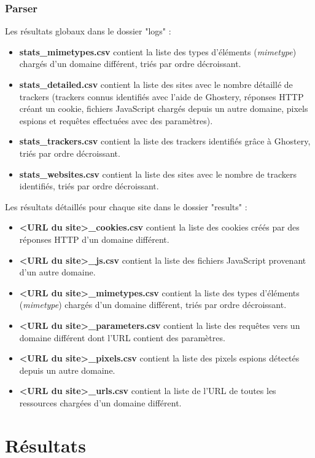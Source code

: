 \subsubsection{Parser}
Les résultats globaux dans le dossier "logs" :
\begin{itemize}
	\item \textbf{stats\_mimetypes.csv} contient la liste des types d'éléments (\textit{mimetype}) chargés d'un domaine différent, triés par ordre décroissant.
	\item \textbf{stats\_detailed.csv} contient la liste des sites avec le nombre détaillé de trackers (trackers connus identifiés avec l'aide de Ghostery, réponses HTTP créant un cookie, fichiers JavaScript chargés depuis un autre domaine, pixels espions et requêtes effectuées avec des paramètres).
	\item \textbf{stats\_trackers.csv} contient la liste des trackers identifiés grâce à Ghostery, triés par ordre décroissant.
	\item \textbf{stats\_websites.csv} contient la liste des sites avec le nombre de trackers identifiés, triés par ordre décroissant.
	\newline
\end{itemize}

Les résultats détaillés pour chaque site dans le dossier "results" :
\begin{itemize}
	\item \textbf{<URL du site>\_cookies.csv} contient la liste des cookies créés par des réponses HTTP d'un domaine différent.
	\item \textbf{<URL du site>\_js.csv} contient la liste des fichiers JavaScript provenant d'un autre domaine.
	\item \textbf{<URL du site>\_mimetypes.csv} contient la liste des types d'éléments (\textit{mimetype}) chargés d'un domaine différent, triés par ordre décroissant.
	\item \textbf{<URL du site>\_parameters.csv} contient la liste des requêtes vers un domaine différent dont l'URL contient des paramètres.
	\item \textbf{<URL du site>\_pixels.csv} contient la liste des pixels espions détectés depuis un autre domaine.
	\item \textbf{<URL du site>\_urls.csv} contient la liste de l'URL de toutes les ressources chargées d'un domaine différent.
	\newline
\end{itemize}

\section{Résultats}

